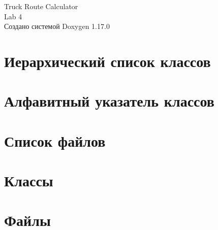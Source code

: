 \documentclass[twoside]{book}
\newcommand{\+}{\discretionary{\mbox{\scriptsize$\hookleftarrow$}}{}{}}
\newcommand{\clearemptydoublepage}{%
    \newpage{\pagestyle{empty}\cleardoublepage}%
  }
\begin{document}
  \raggedbottom
    \hypersetup{pageanchor=false,
                bookmarksnumbered=true,
                pdfencoding=unicode
               }
  \begin{titlepage}
  \vspace*{7cm}
  \begin{center}%
  {\Large Truck Route Calculator}\\
  [1ex]\large Lab 4 \\
  \vspace*{1cm}
  {\large Создано системой Doxygen 1.17.0}\\
  \end{center}
  \end{titlepage}
  \clearemptydoublepage
  \tableofcontents
  \clearemptydoublepage
  \hypersetup{pageanchor=true}

\chapter{Иерархический список классов}

\chapter{Алфавитный указатель классов}

\chapter{Список файлов}

\chapter{Классы}





\chapter{Файлы}










  \backmatter
  \newpage
  \clearemptydoublepage
  \printindex
\end{document}
